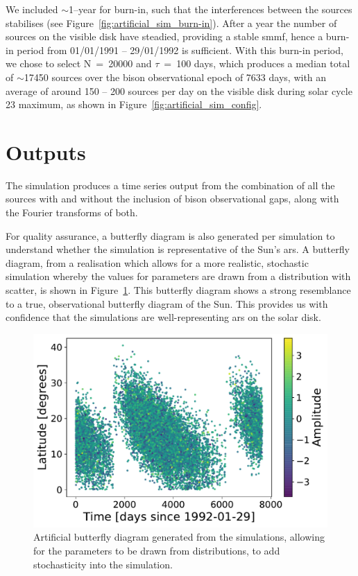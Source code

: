 We included $\sim$1--year for burn-in, such that the interferences between the sources stabilises (see Figure~\ref{fig:artificial_sim_burn-in}). After a year the number of sources on the visible disk have steadied, providing a stable \gls{smmf}, hence a burn-in period from 01/01/1991 -- 29/01/1992 is sufficient. With this burn-in period, we chose to select N~=~20000 and $\tau$~=~100 days, which produces a median total of $\sim$17450 sources over the \gls{bison} observational epoch of 7633 days, with an average of around 150 -- 200 sources per day on the visible disk during solar cycle 23 maximum, as shown in Figure~\ref{fig:artificial_sim_config}.




\section{Outputs}


The simulation produces a time series output from the combination of all the sources with and without the inclusion of \gls{bison} observational gaps, along with the Fourier transforms of both. 

For quality assurance, a butterfly diagram is also generated per simulation to understand whether the simulation is representative of the Sun's \gls{ar}s. A butterfly diagram, from a realisation which allows for a more realistic, stochastic simulation whereby the values for parameters are drawn from a distribution with scatter, is shown in Figure~\ref{fig:fake_butterfly}. This butterfly diagram shows a strong resemblance to a true, observational butterfly diagram of the Sun. This provides us with confidence that the simulations are well-representing \gls{ar}s on the solar disk.


\begin{figure}[ht!]
	\centering
	\includegraphics[width=0.85\columnwidth]{24h_fake_butterfly.pdf}
	\caption{Artificial butterfly diagram generated from the simulations, allowing for the parameters to be drawn from distributions, to add stochasticity into the simulation.}
	\label{fig:fake_butterfly}
\end{figure}



